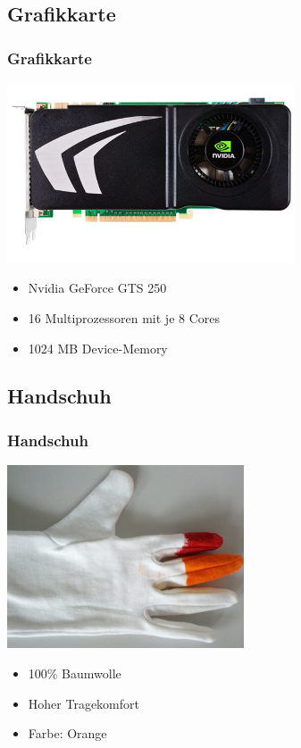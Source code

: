 \documentclass[compress]{beamer}
\begin{document}
\subsection{Grafikkarte}
\begin{frame}
\frametitle{Grafikkarte}

\hspace*{1.8cm}\includegraphics[width=8.5cm]{gts250.png}

\begin{itemize}
	\item Nvidia GeForce GTS 250
	\item 16 Multiprozessoren mit je 8 Cores
	\item 1024 MB Device-Memory	
\end{itemize}
\end{frame}

\subsection{Handschuh}
\begin{frame}
\frametitle{Handschuh}

\hspace*{2.5cm}\includegraphics[width=7cm]{handschuh.png}

\begin{itemize}
	\item 100\% Baumwolle
	\item Hoher Tragekomfort
	\item Farbe: Orange
\end{itemize}
\end{frame}
\end{document}
